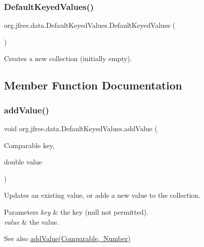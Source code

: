 \subsubsection{\texorpdfstring{Default\+Keyed\+Values()}{DefaultKeyedValues()}}
{\footnotesize\ttfamily org.\+jfree.\+data.\+Default\+Keyed\+Values.\+Default\+Keyed\+Values (\begin{DoxyParamCaption}{ }\end{DoxyParamCaption})}

Creates a new collection (initially empty). 

\subsection{Member Function Documentation}
\mbox{\label{classorg_1_1jfree_1_1data_1_1_default_keyed_values_ab603b9f4bc70bd9b8c223a00ed0974f7}} 
\subsubsection{\texorpdfstring{add\+Value()}{addValue()}\hspace{0.1cm}{\footnotesize\ttfamily [1/2]}}
{\footnotesize\ttfamily void org.\+jfree.\+data.\+Default\+Keyed\+Values.\+add\+Value (\begin{DoxyParamCaption}\item[{Comparable}]{key,  }\item[{double}]{value }\end{DoxyParamCaption})}

Updates an existing value, or adds a new value to the collection.


\begin{DoxyParams}{Parameters}
{\em key} & the key ({\ttfamily null} not permitted). \\
\hline
{\em value} & the value.\\
\hline
\end{DoxyParams}
\begin{DoxySeeAlso}{See also}
\mbox{\hyperlink{classorg_1_1jfree_1_1data_1_1_default_keyed_values_ace54b91d7e6e96f2e14045ebde67b6fd}{add\+Value(\+Comparable, Number)}} 
\end{DoxySeeAlso}
\mbox{\label{classorg_1_1jfree_1_1data_1_1_default_keyed_values_ace54b91d7e6e96f2e14045ebde67b6fd}} 
